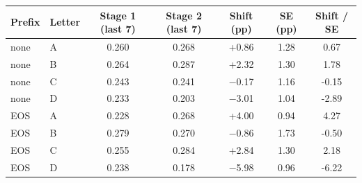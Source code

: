 \begin{tabular}{llccccc}
\toprule
Prefix & Letter & Stage 1 (last 7) & Stage 2 (last 7) & Shift (pp) & SE (pp) & Shift / SE \\
\midrule
none & A & 0.260 & 0.268 & +0.86 & 1.28 & 0.67 \\
none & B & 0.264 & 0.287 & +2.32 & 1.30 & 1.78 \\
none & C & 0.243 & 0.241 & $-$0.17 & 1.16 & -0.15 \\
none & D & 0.233 & 0.203 & $-$3.01 & 1.04 & -2.89 \\
EOS & A & 0.228 & 0.268 & +4.00 & 0.94 & 4.27 \\
EOS & B & 0.279 & 0.270 & $-$0.86 & 1.73 & -0.50 \\
EOS & C & 0.255 & 0.284 & +2.84 & 1.30 & 2.18 \\
EOS & D & 0.238 & 0.178 & $-$5.98 & 0.96 & -6.22 \\
\bottomrule
\end{tabular}
